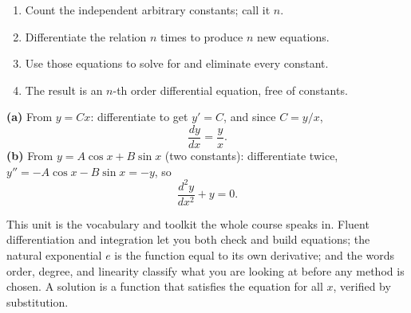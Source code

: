 \documentclass[11pt]{article}
\begin{document}
\begin{methodbox}
\begin{enumerate}[leftmargin=1.6em, itemsep=2pt]
    \item Count the independent arbitrary constants; call it $n$.
    \item Differentiate the relation $n$ times to produce $n$ new equations.
    \item Use those equations to solve for and eliminate every constant.
    \item The result is an $n$-th order differential equation, free of constants.
\end{enumerate}
\end{methodbox}

\begin{examplebox}
\textbf{(a)} From $y = Cx$: differentiate to get $y' = C$, and since $C = y/x$,
\[ \frac{dy}{dx} = \frac{y}{x}. \]
\textbf{(b)} From $y = A\cos x + B\sin x$ (two constants): differentiate twice,
$y'' = -A\cos x - B\sin x = -y$, so
\[ \frac{d^{2}y}{dx^{2}} + y = 0. \]
\end{examplebox}

\vspace{0.8em}
\begin{conceptbox}
This unit is the vocabulary and toolkit the whole course speaks in. Fluent
\textcolor{accentorange}{differentiation and integration} let you both check and
build equations; the \textcolor{accentorange}{natural exponential $e$} is the
function equal to its own derivative; and the words
\textcolor{accentorange}{order, degree, and linearity} classify what you are
looking at before any method is chosen. A \textcolor{accentorange}{solution} is a
function that satisfies the equation for all $x$, verified by substitution.
\end{conceptbox}
\end{document}

